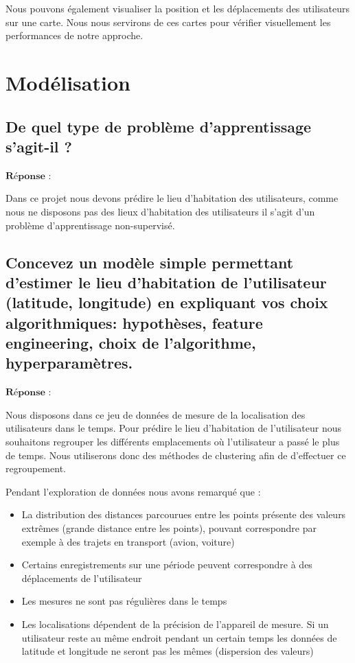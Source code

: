 \documentclass[10pt,a4paper]{article}
\begin{document}
Nous pouvons également visualiser la position et les déplacements des utilisateurs sur une carte.
Nous nous servirons de ces cartes pour vérifier visuellement les performances de notre approche.

\vspace{10mm}
\section{Modélisation}

\vspace{5mm}

\subsection{De quel type de problème d'apprentissage s'agit-il ?}

\vspace{5mm}
$\textbf{Réponse : }$

Dans ce projet nous devons prédire le lieu d'habitation des utilisateurs, comme nous ne disposons pas des lieux d'habitation des utilisateurs
il s'agit d'un problème d'apprentissage non-supervisé.
\vspace{5mm}

\subsection{Concevez un modèle simple permettant d'estimer le lieu d'habitation
    de l'utilisateur (latitude, longitude) en expliquant vos choix algorithmiques:
    hypothèses, feature engineering, choix de l'algorithme, hyperparamètres.}


\vspace{5mm}
$\textbf{Réponse : }$

Nous disposons dans ce jeu de données de mesure de la localisation des utilisateurs dans le temps.
Pour prédire le lieu d'habitation de l'utilisateur nous souhaitons regrouper les différents
emplacements où l'utilisateur a passé le plus de temps. Nous utiliserons donc des méthodes de
clustering afin de d'effectuer ce regroupement.
\vspace{5mm}

Pendant l'exploration de données nous avons remarqué que :
\begin{itemize}[label=\textbullet, font=\LARGE]
    \item La distribution des distances parcourues entre les points présente des valeurs extrêmes (grande distance entre les points),
          pouvant correspondre par exemple à des trajets en transport (avion, voiture)
    \item Certains enregistrements sur une période peuvent correspondre à des déplacements de l'utilisateur
    \item Les mesures ne sont pas régulières dans le temps
    \item Les localisations dépendent de la précision de l'appareil de mesure. Si un utilisateur reste au même endroit pendant un certain temps les données
          de latitude et longitude ne seront pas les mêmes (dispersion des valeurs)
\end{itemize}
\end{document}
